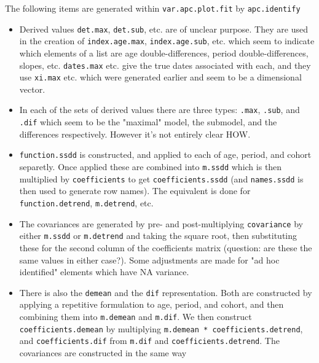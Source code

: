 \documentclass{article}
\begin{document}
The following items are generated within \texttt{var.apc.plot.fit} by \texttt{apc.identify}
\begin{itemize}
\item Derived values \texttt{det.max}, \texttt{det.sub}, etc. are of unclear purpose. They are used in the creation of \texttt{index.age.max}, \texttt{index.age.sub}, etc. which seem to indicate which elements of a list are age double-differences, period double-differences, slopes, etc. \texttt{dates.max} etc. give the true dates associated with each, and they use \texttt{xi.max} etc. which were generated earlier and seem to be a dimensional vector. 
\item In each of the sets of derived values there are three types: \texttt{.max}, \texttt{.sub}, and \texttt{.dif} which seem to be the "maximal" model, the submodel, and the differences respectively. However it's not entirely clear HOW.
\item \texttt{function.ssdd} is constructed, and applied to each of age, period, and cohort separetly. Once applied these are combined into \texttt{m.ssdd} which is then multiplied by \texttt{coefficients} to get \texttt{coefficients.ssdd} (and \texttt{names.ssdd} is then used to generate row names). The equivalent is done for \texttt{function.detrend}, \texttt{m.detrend}, etc.
\item The covariances are generated by pre- and post-multiplying \texttt{covariance} by either \texttt{m.ssdd} or \texttt{m.detrend} and taking the square root, then substituting these for the second column of the coefficients matrix (question: are these the same values in either case?). Some adjustments are made for "ad hoc identified" elements which have NA variance. 
\item There is also the \texttt{demean} and the \texttt{dif} representation. Both are constructed by applying a repetitive formulation to age, period, and cohort, and then combining them into \texttt{m.demean} and \texttt{m.dif}. We then construct \texttt{coefficients.demean} by multiplying \texttt{m.demean * coefficients.detrend}, and \texttt{coefficients.dif} from \texttt{m.dif} and \texttt{coefficients.detrend}. The covariances are constructed in the same way  
\end{itemize}
\end{document}
